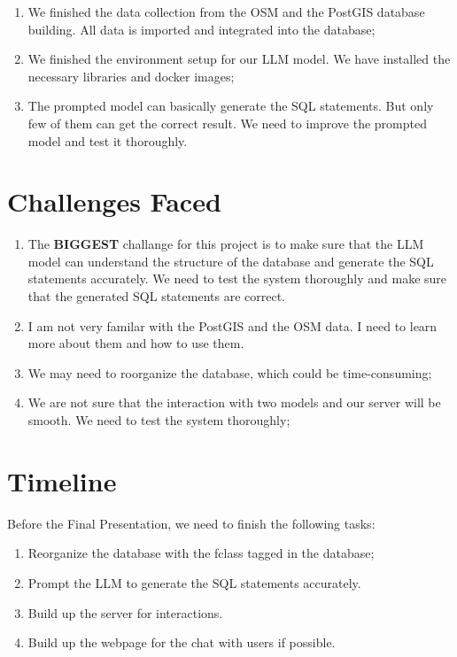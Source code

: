 \documentclass{article}
\begin{document}
\begin{enumerate}
    \item We finished the data collection from the OSM and the PostGIS database building. All data is imported and integrated into the database;
    \item We finished the environment setup for our LLM model. We have installed the necessary libraries and docker images;
    \item The prompted model can basically generate the SQL statements. But only few of them can get the correct result. We need to improve the prompted model and test it thoroughly.
\end{enumerate}

\section{Challenges Faced}
\begin{enumerate}
    \item The \textbf{BIGGEST} challange for this project is to make sure that the LLM model can understand the structure of the database and generate the SQL statements accurately. We need to test the system thoroughly and make sure that the generated SQL statements are correct.
    \item I am not very familar with the PostGIS and the OSM data. I need to learn more about them and how to use them.
    \item We may need to roorganize the database, which could be time-consuming;
    \item We are not sure that the interaction with two models and our server will be smooth. We need to test the system thoroughly;
\end{enumerate}

\section{Timeline}
Before the Final Presentation, we need to finish the following tasks:

\begin{enumerate}
    \item Reorganize the database with the fclass tagged in the database;
    \item Prompt the LLM to generate the SQL statements accurately.
    \item Build up the server for interactions.
    \item Build up the webpage for the chat with users if possible.
\end{enumerate}
\end{document}
